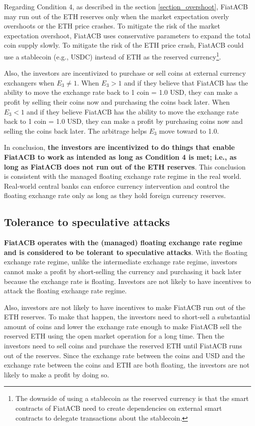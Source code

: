 \documentclass[dvipdfmx,a4paper]{article}
\begin{document}
Regarding Condition 4, as described in the section \ref{section_overshoot}, FiatACB may run out of the ETH reserves only when the market expectation overly overshoots or the ETH price crashes. To mitigate the risk of the market expectation overshoot, FiatACB uses conservative parameters to expand the total coin supply slowly. To mitigate the risk of the ETH price crash, FiatACB could use a stablecoin (e.g., USDC) instead of ETH as the reserved currency\footnote{The downside of using a stablecoin as the reserved currency is that the smart contracts of FiatACB need to create dependencies on external smart contracts to delegate transactions about the stablecoin.}.

Also, the investors are incentivized to purchase or sell coins at external currency exchangers when $E_3\neq 1$. When $E_3>1$ and if they believe that FiatACB has the ability to move the exchange rate back to 1 coin = 1.0 USD, they can make a profit by selling their coins now and purchasing the coins back later. When $E_3<1$ and if they believe FiatACB has the ability to move the exchange rate back to 1 coin = 1.0 USD, they can make a profit by purchasing coins now and selling the coins back later. The arbitrage helps $E_3$ move toward to 1.0.

In conclusion, \textbf{the investors are incentivized to do things that enable FiatACB to work as intended as long as Condition 4 is met; i.e., as long as FiatACB does not run out of the ETH reserves}. This conclusion is consistent with the managed floating exchange rate regime in the real world. Real-world central banks can enforce currency intervention and control the floating exchange rate only as long as they hold foreign currency reserves.

\subsection{Tolerance to speculative attacks}

\textbf{FiatACB operates with the (managed) floating exchange rate regime and is considered to be tolerant to speculative attacks}. With the floating exchange rate regime, unlike the intermediate exchange rate regime, investors cannot make a profit by short-selling the currency and purchasing it back later because the exchange rate is floating. Investors are not likely to have incentives to attack the floating exchange rate regime.

Also, investors are not likely to have incentives to make FiatACB run out of the ETH reserves. To make that happen, the investors need to short-sell a substantial amount of coins and lower the exchange rate enough to make FiatACB sell the reserved ETH using the open market operation for a long time. Then the investors need to sell coins and purchase the reserved ETH until FiatACB runs out of the reserves. Since the exchange rate between the coins and USD and the exchange rate between the coins and ETH are both floating, the investors are not likely to make a profit by doing so.
\end{document}
